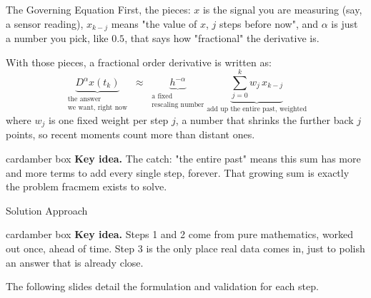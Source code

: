 \documentclass[10pt,aspectratio=169]{beamer}
\newcommand{\ideacard}[1]{%
  \begin{beamercolorbox}[wd=\linewidth,sep=0.9em,rounded=true]{cardamber box}
  {\color{amberAccent}\textbf{Key idea.}} #1
  \end{beamercolorbox}}
\begin{document}
\begin{frame}{The Governing Equation}
  \small First, the pieces: $x$ is the signal you are measuring (say, a sensor reading), $x_{k-j}$ means "the value of $x$, $j$ steps before now", and $\alpha$ is just a number you pick, like $0.5$, that says how "fractional" the derivative is.

  \vspace{0.3em}
  With those pieces, a fractional order derivative is written as:
  \[
  \underbrace{D^\alpha x(t_k)}_{\substack{\text{the answer}\\\text{we want, right now}}} \;\approx\; \underbrace{h^{-\alpha}}_{\substack{\text{a fixed}\\\text{rescaling number}}} \underbrace{\sum_{j=0}^{k} w_j\, x_{k-j}}_{\text{add up the entire past, weighted}}
  \]
  where $w_j$ is one fixed weight per step $j$, a number that shrinks the further back $j$ points, so recent moments count more than distant ones.

  \vspace{0.3em}
  \ideacard{The catch: "the entire past" means this sum has more and more terms to add every single step, forever. That growing sum is exactly the problem fracmem exists to solve.}
\end{frame}

\begin{frame}{Solution Approach}
  \begin{center}
  \end{center}

  \vspace{0.6em}
  \ideacard{Steps 1 and 2 come from pure mathematics, worked out once, ahead of time. Step 3 is the only place real data comes in, just to polish an answer that is already close.}

  \vspace{0.4em}
  \centering\small\color{slate} The following slides detail the formulation and validation for each step.
\end{frame}
\end{document}
